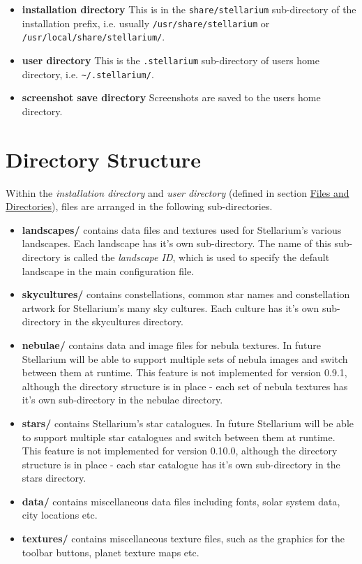 \begin{itemize}
\item
  \textbf{installation directory} This is in the
  \texttt{share/stellarium} sub-directory of the installation prefix,
  i.e. usually \texttt{/usr/share/stellarium} or
  \texttt{/usr/local/share/stellarium/}.
\item
  \textbf{user directory} This is the \texttt{.stellarium} sub-directory
  of users home directory, i.e. \texttt{\textasciitilde{}/.stellarium/}.
\item
  \textbf{screenshot save directory} Screenshots are saved to the users
  home directory.
\end{itemize}

\section{Directory Structure}\label{directory-structure}
\label{sec:FilesAndDirectories:DirectoryStructure}

Within the \emph{installation directory} and \emph{user directory}
(defined in section \href{Advanced_Use\#Files_and_Directories}{Files and
Directories}), files are arranged in the following sub-directories.

\begin{itemize}
\item
  \textbf{landscapes/} contains data files and textures used for
  Stellarium's various landscapes. Each landscape has it's own
  sub-directory. The name of this sub-directory is called the
  \emph{landscape ID}, which is used to specify the default landscape in
  the main configuration file.
\item
  \textbf{skycultures/} contains constellations, common star names and
  constellation artwork for Stellarium's many sky cultures. Each culture
  has it's own sub-directory in the skycultures directory.
\item
  \textbf{nebulae/} contains data and image files for nebula textures.
  In future Stellarium will be able to support multiple sets of nebula
  images and switch between them at runtime. This feature is not
  implemented for version 0.9.1, although the directory structure is in
  place - each set of nebula textures has it's own sub-directory in the
  nebulae directory.
\item
  \textbf{stars/} contains Stellarium's star catalogues. In future
  Stellarium will be able to support multiple star catalogues and switch
  between them at runtime. This feature is not implemented for version
  0.10.0, although the directory structure is in place - each star
  catalogue has it's own sub-directory in the stars directory.
\item
  \textbf{data/} contains miscellaneous data files including fonts,
  solar system data, city locations etc.
\item
  \textbf{textures/} contains miscellaneous texture files, such as the
  graphics for the toolbar buttons, planet texture maps etc.
\end{itemize}

